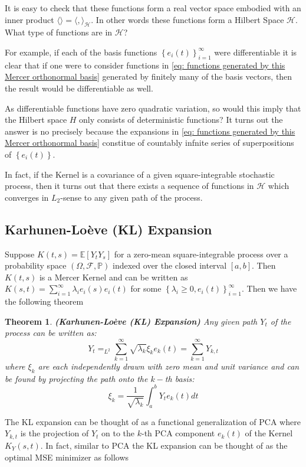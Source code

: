 \documentclass[11pt]{article}
\theoremstyle{plain} %
\newtheorem{theorem}{Theorem}[section]
\theoremstyle{remark}
\begin{document}
It is easy to check that these functions form a real vector space embodied with
an inner product $\langle\rangle=\langle,\rangle_{\mathcal{H}}$. In other words
these functions form a Hilbert Space $\mathcal{H}$. What type of functions are in $\mathcal{H}$?

For example, if each of the basis functions
$\left\{e_{i}(t)\right\}_{i=1}^{\infty}$ were differentiable it is clear that if
one were to consider functions in \cref{eq: functions generated by this Mercer orthonormal basis} generated by finitely many of the basis
vectors, then the result would be differentiable as well.

As differentiable functions have zero quadratic variation, so would this imply
that the Hilbert space $H$ only consists of deterministic functions? It turns
out the answer is no precisely because the expansions in \cref{eq: functions generated by this Mercer orthonormal basis} constitue of
countably infnite series of superpositions of $\left\{e_{i}(t)\right\}$.

In fact, if the Kernel is a covariance of a given square-integrable stochastic
process, then it turns out that there exists a sequence of functions in
$\mathcal{H}$ which converges in $L_{2}$-sense to any given path of the process.

\subsection{Karhunen-Loève (KL) Expansion}
Suppose $K(t, s)=\mathbb{E}\left[Y_{t} Y_{s}\right]$ for a zero-mean
square-integrable process over a probability space $(\Omega, \mathcal{F}, \mathbb{P})$
indexed over the closed interval $[a, b]$. Then $K(t, s)$ is a Mercer Kernel and
can be written as $K(s, t)=\sum_{i=1}^{\infty} \lambda_{i} e_{i}(s) e_{i}(t)$
for some $\left\{\lambda_{i} \geq 0, e_{i}(t)\right\}_{i=1}^{\infty}$. Then we
have the following theorem

\begin{theorem}\textbf{(Karhunen-Loève (KL) Expansion)}
  Any given path $Y_{t}$ of the process can be written as:
$$
  Y_{t}=_{L^{2}} \sum_{k=1}^{\infty} \sqrt{\lambda_{k}} \xi_{k} e_{k}(t)=\sum_{k=1}^{\infty} Y_{k, t}
$$
where $\xi_{k}$ are each independently drawn with zero mean and unit variance
and can be found by projecting the path onto the $k-$th basis:
$$
  \xi_{k}=\frac{1}{\sqrt{\lambda_{k}}} \int_{a}^{b} Y_{t} e_{k}(t) d t
$$
\end{theorem}

The KL expansion can be thought of as a functional generalization of
PCA where $Y_{k, t}$ is the projection of $Y_{t}$ on to the $k$-th PCA component
$e_{k}(t)$ of the Kernel $K_{Y}(s, t)$. In fact, similar to PCA the KL expansion can be thought of as the optimal MSE
minimizer as follows
\end{document}
